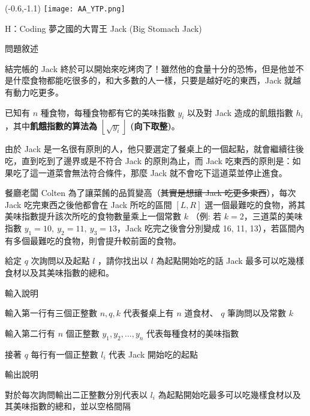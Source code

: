 \documentclass[12pt]{article}
\newcommand{\ProblemTitleFont}{\ProblemTitleMainFont\ProblemTitleCJKFont}
\newcommand{\ProblemTitle}[2]{\noindent\Large{\ProblemTitleFont #1 (#2)}\normalsize\par}
\newcommand{\ProblemSection}[1]{\vspace{0.6cm}\par\noindent\large{\ProblemTitleFont #1}\normalsize\par}
\newcommand{\ProblemStatement}{\ProblemSection{問題敘述}}
\newcommand{\ProblemInput}{\ProblemSection{輸入說明}}
\newcommand{\ProblemOutput}{\ProblemSection{輸出說明}}
\begin{document}
\begin{textblock}{0.1}(-0.6,-1.1)
	\texttt{[image: AA\_YTP.png]}
\end{textblock}


\renewcommand{\headrulewidth}{0pt}
\renewcommand{\baselinestretch}{1.3}
\setlength\parindent{24pt}
\setlength\parskip{12pt}
\cfoot{\thepage}

\ProblemTitle{H：Coding 夢之國的大胃王 Jack}{Big Stomach Jack}

\ProblemStatement

結完帳的 Jack 終於可以開始來吃烤肉了！雖然他的食量十分的恐怖，但是他並不是什麼食物都能吃很多的，和大多數的人一樣，只要是越好吃的東西，Jack 就越有動力吃更多。

已知有 $n$ 種食物，每種食物都有它的美味指數 $y_i$ 以及對 Jack 造成的飢餓指數 $h_i$，其中\textbf{飢餓指數的算法為 $\left \lfloor \sqrt{y_i} \right \rfloor$ (向下取整)}。

由於 Jack 是一名很有原則的人，他只要選定了餐桌上的一個起點，就會繼續往後吃，直到吃到了邊界或是不符合 Jack 的原則為止，而 Jack 吃東西的原則是：如果吃了這一道菜會無法符合條件，那麼 Jack 就不會吃下這道菜並停止進食。

餐廳老闆 Colten 為了讓菜餚的品質變高（\sout{其實是想讓 Jack 吃更多東西}），每次 Jack 吃完東西之後他都會在 Jack 所吃的區間 $[L,R]$ 選一個最難吃的食物，將其美味指數提升該次所吃的食物數量乘上一個常數 $k$ （例: 若 $k=2$，三道菜的美味指數 $y_1=10,\ y_2=11,\ y_3=13$，Jack 吃完之後會分別變成 16, 11, 13），若區間內有多個最難吃的食物，則會提升較前面的食物。

給定 $q$ 次詢問以及起點 $l$ ，請你找出以 $l$ 為起點開始吃的話 Jack 最多可以吃幾樣食材以及其美味指數的總和。



\ProblemInput

輸入第一行有三個正整數 $n,q,k$ 代表餐桌上有 $n$ 道食材、 $q$ 筆詢問以及常數 $k$

輸入第二行有 $n$ 個正整數 $y_1,y_2,...,y_n$ 代表每種食材的美味指數 

接著 $q$ 每行有一個正整數 $l_i$ 代表 Jack 開始吃的起點

\clearpage

\ProblemOutput

對於每次詢問輸出二正整數分別代表以 $l_i$ 為起點開始吃最多可以吃幾樣食材以及其美味指數的總和，並以空格間隔
\end{document}
